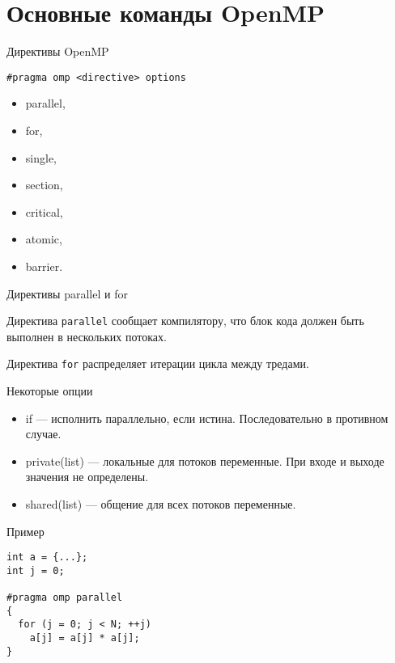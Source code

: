 \section{Основные команды OpenMP}

\begin{frame}[fragile]{Директивы OpenMP}

\begin{lstlisting}
#pragma omp <directive> options
\end{lstlisting}

\begin{itemize}
    \item parallel,
    \item for,
    \item single,
    \item section,
    \item critical,
    \item atomic,
    \item barrier.
\end{itemize}

\end{frame}

\begin{frame}[fragile]{Директивы parallel и for}

Директива \texttt{parallel} сообщает компилятору, что блок кода должен быть выполнен в нескольких потоках.

Директива \texttt{for} распределяет итерации цикла между тредами.

\end{frame}

\begin{frame}{Некоторые опции}

\begin{itemize}
    \item if --- исполнить параллельно, если истина. Последовательно в противном случае.
    \item private(list) --- локальные для потоков переменные. При входе и выходе значения не определены.
    \item shared(list) --- общение для всех потоков переменные.
\end{itemize}

\end{frame}

\begin{frame}[fragile]{Пример}

\begin{lstlisting}
int a = {...};
int j = 0;

#pragma omp parallel
{
  for (j = 0; j < N; ++j)
    a[j] = a[j] * a[j];
}
\end{lstlisting}

\end{frame}

